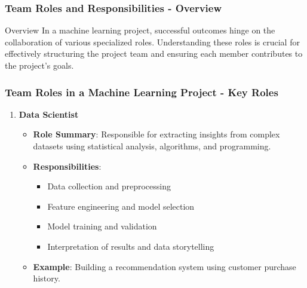 \documentclass[aspectratio=169]{beamer}
\begin{document}
\begin{frame}[fragile]
    \frametitle{Team Roles and Responsibilities - Overview}
    \begin{block}{Overview}
        In a machine learning project, successful outcomes hinge on the collaboration of various specialized roles. Understanding these roles is crucial for effectively structuring the project team and ensuring each member contributes to the project’s goals.
    \end{block}
\end{frame}

\begin{frame}[fragile]
    \frametitle{Team Roles in a Machine Learning Project - Key Roles}
    \begin{enumerate}
        \item \textbf{Data Scientist}  
            \begin{itemize}
                \item \textbf{Role Summary}: Responsible for extracting insights from complex datasets using statistical analysis, algorithms, and programming.
                \item \textbf{Responsibilities}:
                    \begin{itemize}
                        \item Data collection and preprocessing
                        \item Feature engineering and model selection
                        \item Model training and validation
                        \item Interpretation of results and data storytelling
                    \end{itemize}
                \item \textbf{Example}: Building a recommendation system using customer purchase history.
            \end{itemize}
        

\end{enumerate}
\end{frame}
\end{document}
